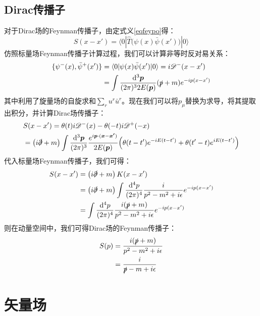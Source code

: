 \section{Dirac传播子}
对于Dirac场的Feynman传播子，由定式义\eqref{eqfeypo}得：
\begin{equation}
S(x-x')=\langle 0|\hat{T}\Big(\psi(x)\bar{\psi}(x')\Big)|0\rangle
\end{equation}
仿照标量场Feynman传播子计算过程，我们可以计算非等时反对易关系：
\begin{align}
\{\psi^-(x),\bar{\psi}^+(x')\}&=\langle0|\psi(x)\bar{\psi}(x')|0\rangle=i\mathscr{D}^-(x-x')\notag\\
&=\int\frac{\mathrm{d}^3\boldsymbol{p}}{(2\pi)^{3}2E(\boldsymbol{p})}(\slashed{p}+m)e^{-ip(x-x')}
\end{align}
其中利用了旋量场的自旋求和$\sum_r u^r\bar{u}^r$。现在我们可以将$p_\mu$替换为求导，将其提取出积分，并计算Dirac场传播子：
\begin{align}
&S(x-x')=\theta(t)i\mathscr{D}^-(x)-\theta(-t)i\mathscr{D}^+(-x)\notag\\
&=\left(i\slashed{\partial}+m\right)\int\frac{\mathrm{d}^3\boldsymbol{p}}{(2\pi)^3}\frac{e^{i\boldsymbol{p}\cdot(\boldsymbol{x}-\boldsymbol{x'})}}{2E(\boldsymbol{p})}\Big(\theta(t-t')e^{-iE(t-t')}+\theta(t'-t)e^{iE(t-t')}\Big)
\end{align}
代入标量场Feynman传播子，我们可得：
\begin{align}
S(x-x')&=\left(i\slashed{\partial}+m\right)K(x-x')\notag\\
&=\left(i\slashed{\partial}+m\right)\int\frac{\mathrm{d}^4p}{(2\pi)^4}\frac{i}{p^2-m^2+i\epsilon}e^{-ip(x-x')}\notag\\
&=\int\frac{\mathrm{d}^4p}{(2\pi)^4}\frac{i(\slashed{p}+m)}{p^2-m^2+i\epsilon}e^{-ip(x-x')}
\end{align}
则在动量空间中，我们可得Dirac场的Feynman传播子：
\begin{align}
S(p)&=\frac{i(\slashed{p}+m)}{p^2-m^2+i\epsilon}\notag\\
&=\frac{i}{\slashed{p}-m+i\epsilon}
\end{align}
\chapter{矢量场}
